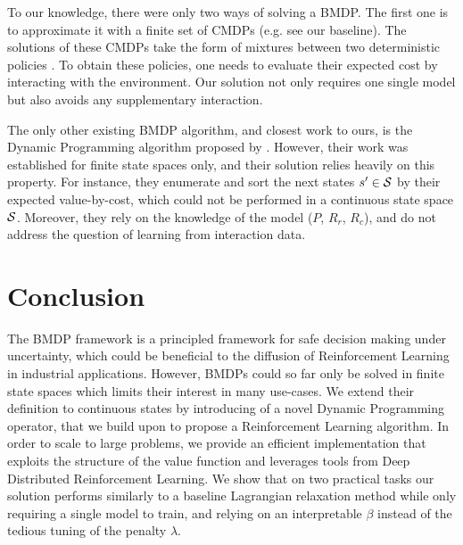 To our knowledge, there were only two ways of solving a BMDP. The first one is to approximate it with a finite set of CMDPs (e.g. see our \FTQl baseline). The solutions of these CMDPs take the form of mixtures between two deterministic policies \citep[Theorem 4.4,][]{BEUTLER1985236}. To obtain these policies, one needs to evaluate their expected cost by interacting with the environment. Our solution not only requires one single model but also avoids any supplementary interaction.

The only other existing BMDP algorithm, and closest work to ours, is the Dynamic Programming algorithm proposed by \citet{Boutilier_Lu:uai16}. However, their work was established for finite state spaces only, and their solution relies heavily on this property. For instance, they enumerate and sort the next states $s'\in\mathcal{S}$ by their expected value-by-cost, which could not be performed in a continuous state space $\mathcal{S}$. Moreover, they rely on the knowledge of the model ($P$, $R_r$, $R_c$), and do not address the question of learning from interaction data.

\section*{Conclusion}
\label{sec:conclusion}
The BMDP framework is a principled framework for safe decision making under uncertainty, which could be beneficial to the diffusion of Reinforcement Learning in industrial applications. However, BMDPs could so far only be solved in finite state spaces which limits their interest in many use-cases. We extend their definition to continuous states by introducing of a novel Dynamic Programming operator, that we build upon to propose a Reinforcement Learning algorithm. In order to scale to large problems, we provide an efficient implementation that exploits the structure of the value function and leverages tools from Deep Distributed Reinforcement Learning. We show that on two practical tasks our solution performs similarly to a baseline Lagrangian relaxation method while only requiring a single model to train, and relying on an interpretable $\beta$ instead of the tedious tuning of the penalty $\lambda$.




